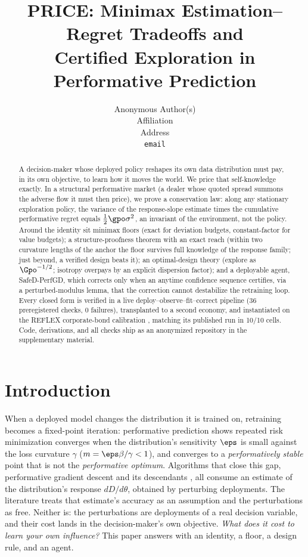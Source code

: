 \documentclass{article}
\title{PRICE: Minimax Estimation--Regret Tradeoffs and\\ Certified Exploration in Performative Prediction}
\author{%
  Anonymous Author(s) \\
  Affiliation \\
  Address \\
  \texttt{email} \\
}
\begin{document}
\maketitle

\begin{abstract}
A decision-maker whose deployed policy reshapes its own data distribution must pay, in its own objective, to learn how it moves the world. We price that self-knowledge exactly. In a structural performative market (a dealer whose quoted spread summons the adverse flow it must then price), we prove a conservation law: along any stationary exploration policy, the variance of the response-slope estimate times the cumulative performative regret equals $\tfrac{1}{2}\gpo\sigma^2$, an invariant of the environment, not the policy. Around the identity sit minimax floors (exact for deviation budgets, constant-factor for value budgets); a structure-proofness theorem with an exact reach (within two curvature lengths of the anchor the floor survives full knowledge of the response family; just beyond, a verified design beats it); an optimal-design theory (explore as $\Gpo^{-1/2}$; isotropy overpays by an explicit dispersion factor); and a deployable agent, SafeD-PerfGD, which corrects only when an anytime confidence sequence certifies, via a perturbed-modulus lemma, that the correction cannot destabilize the retraining loop. Every closed form is verified in a live deploy--observe--fit--correct pipeline (36 preregistered checks, 0 failures), transplanted to a second economy, and instantiated on the REFLEX corporate-bond calibration \citep{reflex2026}, matching its published run in 10/10 cells. Code, derivations, and all checks ship as an anonymized repository in the supplementary material.
\end{abstract}

\section{Introduction}
\label{sec:intro}

When a deployed model changes the distribution it is trained on, retraining becomes a fixed-point iteration: performative prediction \citep{perdomo2020performative,hardt2023performative} shows repeated risk minimization converges when the distribution's sensitivity $\eps$ is small against the loss curvature $\gamma$ ($m = \eps\beta/\gamma < 1$), and converges to a \emph{performatively stable} point that is not the \emph{performative optimum}. Algorithms that close this gap, performative gradient descent and its descendants \citep{izzo2021learn,miller2021outside,mendler2020stochastic,drusvyatskiy2022stochastic,li2022state,brown2022performative}, all consume an estimate of the distribution's response $dD/d\theta$, obtained by perturbing deployments. The literature treats that estimate's accuracy as an assumption and the perturbations as free. Neither is: the perturbations are deployments of a real decision variable, and their cost lands in the decision-maker's own objective. \emph{What does it cost to learn your own influence?} This paper answers with an identity, a floor, a design rule, and an agent.
\end{document}

